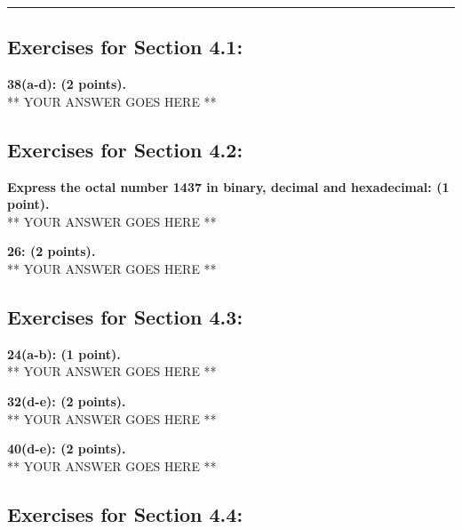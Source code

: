 \documentclass[12pt]{article}  %
\begin{document}
\rule{6in}{.1pt}       %


\subsection*{Exercises for Section 4.1:}     

\noindent
{\bf 38(a-d): (2 points).} \\
** YOUR ANSWER GOES HERE **

\subsection*{Exercises for Section 4.2:}     

\noindent
{\bf Express the octal number 1437 in binary, decimal and hexadecimal: (1 point).} \\
** YOUR ANSWER GOES HERE **

\noindent
{\bf 26: (2 points).} \\
** YOUR ANSWER GOES HERE **

\subsection*{Exercises for Section 4.3:}     

\noindent
{\bf 24(a-b): (1 point).} \\
** YOUR ANSWER GOES HERE **

\noindent
{\bf 32(d-e): (2 points).} \\
** YOUR ANSWER GOES HERE **

\noindent
{\bf 40(d-e): (2 points).} \\
** YOUR ANSWER GOES HERE **

\subsection*{Exercises for Section 4.4:}     
\end{document}

